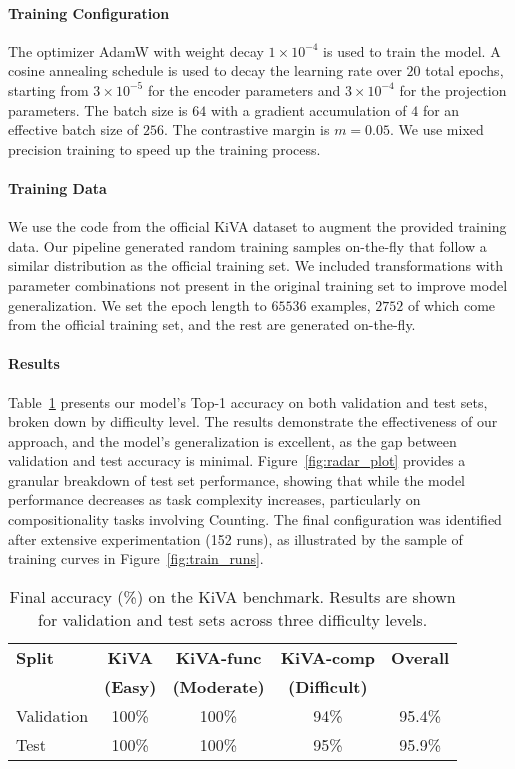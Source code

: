 \documentclass[twocolumn]{article} %
\begin{document}
\paragraph{Training Configuration}
The optimizer AdamW with weight decay $1 \times 10^{-4}$ is used to train the model. 
A cosine annealing schedule is used to decay the learning rate over $20$ total epochs, starting from $3 \times 10^{-5}$ for the encoder parameters and $3 \times 10^{-4}$ for the projection parameters. The batch size is $64$ with a gradient accumulation of $4$ for an effective batch size of $256$. The contrastive margin is $m = 0.05$.
We use mixed precision training to speed up the training process.

\paragraph{Training Data}
We use the code from the official KiVA dataset \cite{yee2025kiva} to augment the provided training data. Our pipeline generated random training samples on-the-fly that follow a similar distribution as the official training set. We included transformations with parameter combinations not present in the original training set to improve model generalization. We set the epoch length to $65536$ examples, $2752$ of which come from the official training set, and the rest are generated on-the-fly.

\paragraph{Results}
Table~\ref{tab:kiva_results} presents our model's Top-1 accuracy on both validation and test sets, broken down by difficulty level. The results demonstrate the effectiveness of our approach, and the model's generalization is excellent, as the gap between validation and test accuracy is minimal. Figure~\ref{fig:radar_plot} provides a granular breakdown of test set performance, showing that while the model performance decreases as task complexity increases, particularly on compositionality tasks involving Counting. The final configuration was identified after extensive experimentation (152 runs), as illustrated by the sample of training curves in Figure~\ref{fig:train_runs}.

\begin{table}[!htb]
    \caption{Final accuracy (\%) on the KiVA benchmark. Results are shown for validation and test sets across three difficulty levels.}
    \label{tab:kiva_results}
    \centering
    \setlength{\tabcolsep}{5pt} %
    \begin{tabular}{lcccc}
        \toprule
        \textbf{Split} & \textbf{KiVA} & \textbf{KiVA-func} & \textbf{KiVA-comp} & \textbf{Overall} \\
        & \textbf{(Easy)} & \textbf{(Moderate)} & \textbf{(Difficult)} & \\
        \midrule
        Validation & 100\% & 100\% & 94\% & 95.4\% \\
        Test & 100\% & 100\% & 95\% & 95.9\% \\
        \bottomrule
    \end{tabular}
\end{table}
\end{document}
